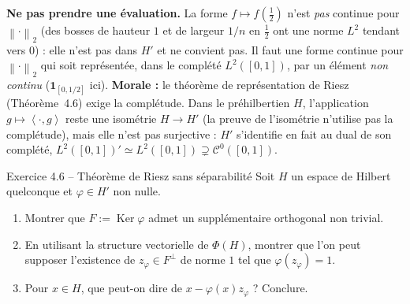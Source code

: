 \documentclass[11pt,a4paper]{article}
\newcommand{\norm}[1]{\left\|#1\right\|}
\newcommand{\Cz}{\mathcal{C}^0}
\DeclareMathOperator{\Ker}{Ker}
\newcommand{\ps}[2]{\left\langle #1,#2\right\rangle}
\theoremstyle{definition}
\begin{document}
\begin{piege}
\textbf{Ne pas prendre une évaluation.} La forme $f\mapsto f(\tfrac12)$ n'est \emph{pas} continue pour $\norm\cdot_2$ (des bosses de hauteur $1$ et de largeur $1/n$ en $\tfrac12$ ont une norme $L^2$ tendant vers $0$) : elle n'est pas dans $H'$ et ne convient pas. Il faut une forme continue pour $\norm\cdot_2$ qui soit représentée, dans le complété $L^2([0,1])$, par un élément \emph{non continu} ($\mathbf 1_{[0,1/2]}$ ici). \textbf{Morale :} le théorème de représentation de Riesz (Théorème~4.6) exige la complétude. Dans le préhilbertien $H$, l'application $g\mapsto\ps\cdot g$ reste une isométrie $H\to H'$ (la preuve de l'isométrie n'utilise pas la complétude), mais elle n'est pas surjective : $H'$ s'identifie en fait au dual de son complété, $L^2([0,1])'\simeq L^2([0,1])\supsetneq\Cz([0,1])$.
\end{piege}

\begin{exo}{Exercice 4.6 -- Théorème de Riesz sans séparabilité}
Soit $H$ un espace de Hilbert quelconque et $\varphi\in H'$ non nulle.
\begin{enumerate}[label=(\arabic*)]
  \item Montrer que $F:=\Ker\varphi$ admet un supplémentaire orthogonal non trivial.
  \item En utilisant la structure vectorielle de $\Phi(H)$, montrer que l'on peut supposer l'existence de $z_\varphi\in F^\perp$ de norme $1$ tel que $\varphi(z_\varphi)=1$.
  \item Pour $x\in H$, que peut-on dire de $x-\varphi(x)z_\varphi$ ? Conclure.
\end{enumerate}
\end{exo}
\end{document}
